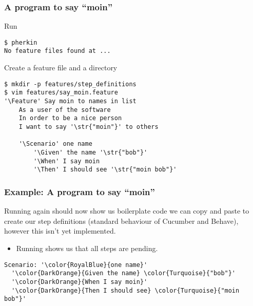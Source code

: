\documentclass[10pt]{vcs_beamer}
\newcommand{\str}[1]{\color{Turquoise}{#1}}
\newcommand{\Feature}{\color{BlueViolet}{Feature:}}
\newcommand{\Scenario}{\color{BlueViolet}{Scenario:}}
\newcommand{\Given}{\color{DarkOrange}{Given}}
\newcommand{\When}{\color{RoyalBlue}{When}}
\newcommand{\Then}{\color{ForestGreen}{Then}}
\begin{document}
\begin{frame}[fragile]
\frametitle{A program to say ``moin''}

Run 
\begin{lstlisting}
$ pherkin
No feature files found at ...
\end{lstlisting}

Create a feature file and a  directory
\begin{lstlisting}[escapeinside='']
$ mkdir -p features/step_definitions
$ vim features/say_moin.feature
'\Feature' Say moin to names in list
    As a user of the software
    In order to be a nice person
    I want to say '\str{"moin"}' to others

    '\Scenario' one name
        '\Given' the name '\str{"bob"}'
        '\When' I say moin
        '\Then' I should see '\str{"moin bob"}'
\end{lstlisting}

\end{frame}

\begin{frame}[fragile]
\frametitle{Example: A program to say ``moin''}

Running  again should now show us boilerplate code we can copy
and paste to create our step definitions (standard behaviour of Cucumber and
Behave), however this isn't yet implemented.

\begin{itemize}
    \item Running  shows us that all steps are pending.
\end{itemize}

\begin{lstlisting}[escapeinside='']
Scenario: '\color{RoyalBlue}{one name}'
  '\color{DarkOrange}{Given the name} \color{Turquoise}{"bob"}'
  '\color{DarkOrange}{When I say moin}'
  '\color{DarkOrange}{Then I should see} \color{Turquoise}{"moin bob"}'
\end{lstlisting}

\end{frame}
\end{document}

